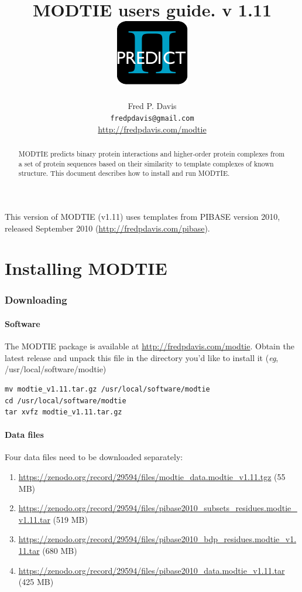 \documentclass[11pt]{article}
\title{MODTIE users guide. v 1.11\\
\includegraphics[scale=1]{modtie_logo.pdf}
}
\author{Fred P. Davis\\{\tt fredpdavis@gmail.com}\\\url{http://fredpdavis.com/modtie}}
\begin{document}
\maketitle

\begin{abstract}
MODTIE predicts binary protein interactions and higher-order protein complexes from a set of protein sequences based on their similarity to template complexes of known structure. This document describes how to install and run MODTIE.
\end{abstract}

\tableofcontents

This version of MODTIE (v1.11) uses templates from PIBASE version 2010, released September 2010 (\url{http://fredpdavis.com/pibase}).

\part{Installing MODTIE}

\section{Downloading}

\subsection{Software}
The MODTIE package is available at \url{http://fredpdavis.com/modtie}. Obtain the latest release and unpack this file in the directory you'd like to install it ({\it eg}, /usr/local/software/modtie)
\lstset{breaklines=true,language=bash,breakatwhitespace=true}
\lstset{frame=single}
\lstset{basicstyle=\ttfamily}
\begin{lstlisting}
mv modtie_v1.11.tar.gz /usr/local/software/modtie
cd /usr/local/software/modtie
tar xvfz modtie_v1.11.tar.gz
\end{lstlisting}

\subsection{Data files}
Four data files need to be downloaded separately:
\begin{enumerate}
\item \url{https://zenodo.org/record/29594/files/modtie_data.modtie_v1.11.tgz} (55 MB)
\item \url{https://zenodo.org/record/29594/files/pibase2010_subsets_residues.modtie_v1.11.tar} (519 MB)
\item \url{https://zenodo.org/record/29594/files/pibase2010_bdp_residues.modtie_v1.11.tar} (680 MB)
\item \url{https://zenodo.org/record/29594/files/pibase2010_data.modtie_v1.11.tar} (425 MB)
\end{enumerate}
\end{document}
